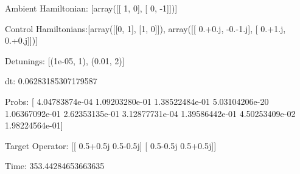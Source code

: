 \documentclass{article}
\begin{document}
    

\newpage

Ambient Hamiltonian: [array([[ 1,  0],
       [ 0, -1]])]

Control Hamiltonians:[array([[0, 1],
       [1, 0]]), array([[ 0.+0.j, -0.-1.j],
       [ 0.+1.j,  0.+0.j]])]

Detunings: [(1e-05, 1), (0.01, 2)]

 dt: 0.06283185307179587

Probs: [  4.04783874e-04   1.09203280e-01   1.38522484e-01   5.03104206e-20
   1.06367092e-01   2.62353135e-01   3.12877731e-04   1.39586442e-01
   4.50253409e-02   1.98224564e-01]

Target Operator: [[ 0.5+0.5j  0.5-0.5j]
 [ 0.5-0.5j  0.5+0.5j]]

Time: 353.44284653663635
\end{document}
